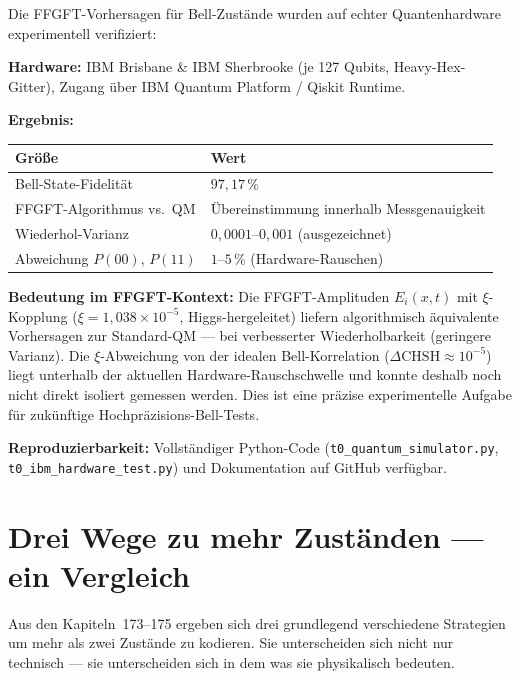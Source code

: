 \begin{keyresult}
Die FFGFT-Vorhersagen für Bell-Zustände wurden auf echter
Quantenhardware experimentell verifiziert:

\textbf{Hardware:} IBM Brisbane \& IBM Sherbrooke (je 127 Qubits,
Heavy-Hex-Gitter), Zugang über IBM Quantum Platform / Qiskit Runtime.

\textbf{Ergebnis:}
\begin{center}
\begin{tabularx}{\textwidth}{lX}
\toprule
Größe & Wert \\
\midrule
Bell-State-Fidelität        & $97{,}17\,\%$ \\
FFGFT-Algorithmus vs.\ QM  & Übereinstimmung innerhalb Messgenauigkeit \\
Wiederhol-Varianz           & $0{,}0001$--$0{,}001$ (ausgezeichnet) \\
Abweichung $P(00)$, $P(11)$ & $1$--$5\,\%$ (Hardware-Rauschen) \\
\bottomrule
\end{tabularx}
\end{center}

\textbf{Bedeutung im FFGFT-Kontext:}
Die FFGFT-Amplituden $E_i(x,t)$ mit $\xi$-Kopplung
($\xi = 1{,}038 \times 10^{-5}$, Higgs-hergeleitet) liefern
algorithmisch äquivalente Vorhersagen zur Standard-QM ---
bei verbesserter Wiederholbarkeit (geringere Varianz).
Die $\xi$-Abweichung von der idealen Bell-Korrelation
($\Delta\text{CHSH} \approx 10^{-5}$) liegt unterhalb
der aktuellen Hardware-Rauschschwelle und konnte deshalb
noch nicht direkt isoliert gemessen werden.
Dies ist eine präzise experimentelle Aufgabe für zukünftige
Hochpräzisions-Bell-Tests.

\textbf{Reproduzierbarkeit:} Vollständiger Python-Code
(\texttt{t0\_quantum\_simulator.py}, \texttt{t0\_ibm\_hardware\_test.py})
und Dokumentation auf GitHub verfügbar.
\end{keyresult}

\section{Drei Wege zu mehr Zuständen --- ein Vergleich}
\label{sec:drei-wege}

Aus den Kapiteln~173--175 ergeben sich drei
grundlegend verschiedene Strategien um mehr
als zwei Zustände zu kodieren.
Sie unterscheiden sich nicht nur technisch ---
sie unterscheiden sich in dem was sie
physikalisch bedeuten.

